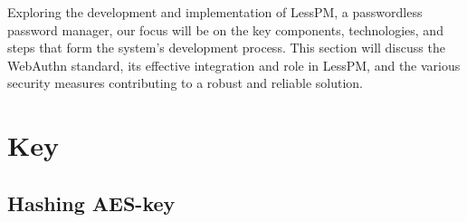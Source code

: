 Exploring the development and implementation of LessPM, a passwordless password manager, our focus will be on the key
components, technologies, and steps that form the system's development process.
This section will discuss the WebAuthn standard, its effective integration and role in LessPM, and the various security
measures contributing to a robust and reliable solution.

\section{Key}\label{sec:key}
\subsection{Hashing AES-key}\label{subsec:hashing-aes-key}

%

